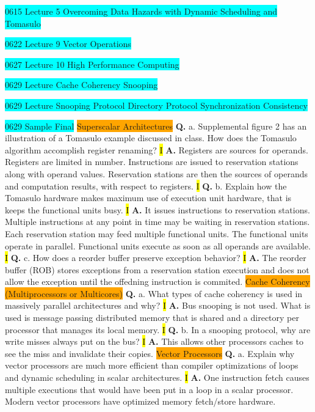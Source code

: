 \documentclass[fontsize=4pt]{scrartcl}
\begin{document}
\colorbox{Cyan}{0615 Lecture 5 Overcoming Data Hazards with Dynamic Scheduling and Tomasulo}

\colorbox{Cyan}{0622 Lecture 9 Vector Operations}

\colorbox{Cyan}{0627 Lecture 10 High Performance Computing}

\colorbox{Cyan}{0629 Lecture Cache Coherency Snooping}

\colorbox{Cyan}{0629 Lecture Snooping Protocol Directory Protocol Synchronization Consistency}

\colorbox{Cyan}{0629 Sample Final}
\colorbox{Orange}{Superscalar Architectures}
\textbf{Q.} a. Supplemental figure 2 has an illustration of a Tomasulo example discussed in class. How does the Tomasulo algorithm accomplish register renaming? 
\hl{I}
\textbf{A.} Registers are sources for operands. Registers are limited in number. Instructions are issued to reservation stations along with operand values. Reservation stations are then the sources of operands and computation results, with respect to registers.
\hl{I}
\textbf{Q.} b. Explain how the Tomasulo hardware makes maximum use of execution unit hardware, that is keeps the functional units busy.
\hl{I}
\textbf{A.} It issues instructions to reservation stations. Multiple instructions at any point in time may be waiting in reservation stations. Each reservation station may feed multiple functional units. The functional units operate in parallel. Functional units execute as soon as all operands are available.
\hl{I}
\textbf{Q.} c. How does a reorder buffer preserve exception behavior?
\hl{I}
\textbf{A.} The reorder buffer (ROB) stores exceptions from a reservation station execution and does not allow the exception until the offedning instruction is commited.
\colorbox{Orange}{Cache Coherency (Multiprocessors or Multicores)} 
\textbf{Q.} a. What types of cache coherency is used in massively parallel architectures and why?
\hl{I}
\textbf{A.} Bus snooping is not used. What is used is message passing distributed memory that is shared and a directory per processor that manages its local memory.
\hl{I}
\textbf{Q.} b. In a snooping protocol, why are write misses always put on the bus?
\hl{I}
\textbf{A.} This allows other processors caches to see the miss and invalidate their copies.
\colorbox{Orange}{Vector Processors}
\textbf{Q.} a. Explain why vector processors are much more efficient than compiler optimizations of loops and dynamic scheduling in scalar architectures.
\hl{I}
\textbf{A.} One instruction fetch causes multiple executions that would have been put in a loop in a scalar processor. Modern vector processors have optimized memory fetch/store hardware.
\end{document}
